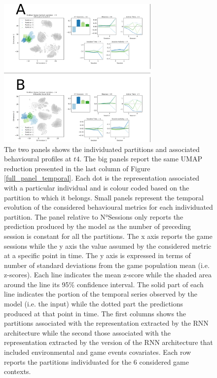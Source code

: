 \begin{figure}[ht]
\includegraphics[width=0.7\textwidth]{images/chapter_4/clust_beha.png}
\centering
\caption[Partitions of the representations generated by the RNN architectures from the behavioural metrics]{The two panels shows the individuated partitions and associated behavioural profiles at $t4$. The big panels report the same UMAP reduction presented in the last column of Figure \ref{full_panel_temporal}. Each dot is the representation associated with a particular individual and is colour coded based on the partition to which it belongs. Small panels represent the temporal evolution of the considered behavioural metrics for each individuated partition. The panel relative to N°Sessions only reports the prediction produced by the model as the number of preceding session is constant for all the partitions. The x axis reports the game sessions while the y axis the value assumed by the considered metric at a specific point in time. The y axis is expressed in terms of number of standard deviations from the game population mean (i.e. z-scores). Each line indicates the mean z-score while the shaded area around the line its 95\% confidence interval. The solid part of each line indicates the portion of the temporal series observed by the model (i.e. the input) while the dotted part the predictions produced at that point in time. The first columns shows the partitions associated with the representation extracted by the RNN architecture while the second those associated with the representation extracted by the version of the RNN architecture that included environmental and game events covariates. Each row reports the partitions individuated for the 6 considered game contexts.}
\label{partition_rnn_behaviour} 
\end{figure}

